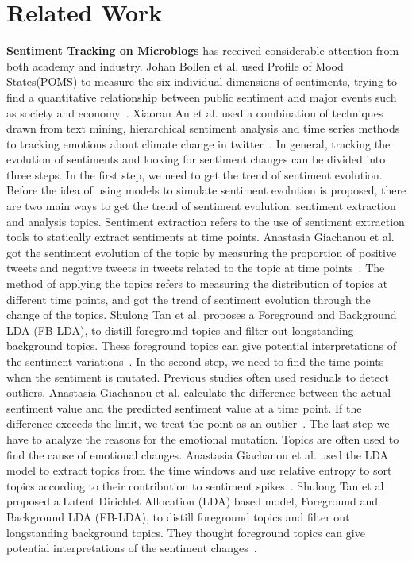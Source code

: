\documentclass[runningheads]{llncs}
\begin{document}
\section{Related Work}\label{sec:related}
\textbf{Sentiment Tracking on Microblogs} has received considerable attention from both academy and industry.
 Johan Bollen et al. used Profile of Mood States(POMS) to measure the six individual dimensions of sentiments, trying to find a quantitative relationship between public sentiment and major events such as society and economy~\cite{Bollen2011sentimentchange}. Xiaoran An et al. used a combination of techniques drawn from text mining, hierarchical sentiment analysis and time series methods to tracking emotions about climate change in twitter~\cite{An2014sentimentchange}. In general, tracking the evolution of sentiments and looking for sentiment changes can be divided into three steps. In the first step, we need to get the trend of sentiment evolution. Before the idea of using models to simulate sentiment evolution is proposed, there are two main ways to get the trend of sentiment evolution: sentiment extraction and analysis topics. Sentiment extraction refers to the use of sentiment extraction tools to statically extract sentiments at time points. Anastasia Giachanou et al. got the sentiment evolution of the topic by measuring the proportion of positive tweets and negative tweets in tweets related to the topic at time points~\cite{Giachanou2016sentitime}. The method of applying the topics refers to measuring the distribution of topics at different time points, and got the trend of sentiment evolution through the change of the topics. Shulong Tan et al. proposes a Foreground and Background LDA (FB-LDA), to distill foreground topics and filter out longstanding background topics. These foreground topics can give potential interpretations of the sentiment variations~\cite{Tan2014topic}. In the second step, we need to find the time points when the sentiment is mutated. Previous studies often used residuals to detect outliers. Anastasia Giachanou et al. calculate the difference between the actual sentiment value and the predicted sentiment value at a time point. If the difference exceeds the limit, we treat the point as an outlier~\cite{Giachanou2016sentitime}. The last step we have to analyze the reasons for the emotional mutation. Topics are often used to find the cause of emotional changes. Anastasia Giachanou et al. used the LDA model to extract topics from the time windows and use relative entropy to sort topics according to their contribution to sentiment spikes~\cite{Giachanou2016sentichange}. Shulong Tan et al proposed a Latent Dirichlet Allocation (LDA) based model, Foreground and Background LDA (FB-LDA), to distill foreground topics and filter out longstanding background topics. They thought foreground topics can give potential interpretations of the sentiment changes~\cite{Tan2014topic}.
\end{document}
